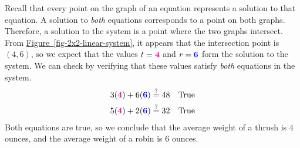 \documentclass[10pt,]{book}
\theoremstyle{plain}
\theoremstyle{definition}
\theoremstyle{definition}
\theoremstyle{definition}
\theoremstyle{definition}
\numberwithin{equation}{section}
\newcommand{\alert}[1]{\boldsymbol{\color{magenta}{#1}}}
\newcommand{\blert}[1]{\boldsymbol{\color{blue}{#1}}}
\newcommand{\amp}{ & }
\begin{document}
	Recall that every point on the graph of an equation represents a solution to that equation. A solution to \emph{both} equations corresponds to a point on both graphs. Therefore, a solution to the system is a point where the two graphs intersect. From \hyperref[fig-2x2-linear-system]{Figure~\ref{fig-2x2-linear-system}}, it appears that the intersection point is \((4, 6)\), so we expect that the values \(t=\alert{4}\) and \(r=\blert{6}\) form the solution to the system. We can check by verifying that these values satisfy \emph{both} equations in the system.
	\begin{align*}

			3(\alert{4}) + 6(\blert{6})\amp\stackrel{?}{=}48 \amp\amp\text{True}
		\\

			5(\alert{4}) + 2(\blert{6})\amp\stackrel{?}{=}32 \amp\amp\text{True}
		
\end{align*}
	Both equations are true, so we conclude that the average weight of a thrush is \(4\) ounces, and the average weight of a robin is \(6\) ounces.
%
\par
\end{document}
